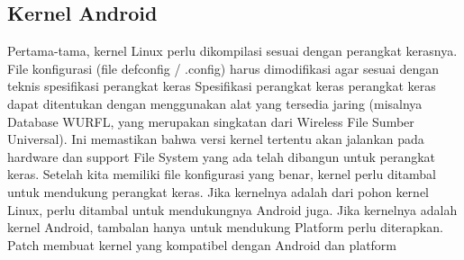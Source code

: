 		\subsection{Kernel Android}
		 Pertama-tama, kernel Linux perlu dikompilasi
		 sesuai dengan perangkat kerasnya. File konfigurasi
		 (file defconfig / .config) harus dimodifikasi agar sesuai dengan teknis
		 spesifikasi perangkat keras Spesifikasi perangkat keras
		 perangkat keras dapat ditentukan dengan menggunakan alat yang tersedia
		 jaring (misalnya Database WURFL, yang merupakan singkatan dari Wireless
		 File Sumber Universal).
		 Ini memastikan bahwa versi kernel tertentu akan
		 jalankan pada hardware dan support File System yang ada
		 telah dibangun untuk perangkat keras.
		 Setelah kita memiliki file konfigurasi yang benar, kernel perlu 
		 ditambal untuk mendukung perangkat keras. Jika kernelnya adalah
		 dari pohon kernel Linux, perlu ditambal untuk mendukungnya
		 Android juga. Jika kernelnya adalah kernel Android, tambalan hanya untuk
		 mendukung Platform perlu diterapkan.
		 Patch membuat kernel yang kompatibel dengan Android dan platform
		 
\cite{engler1995exokernel}
\cite{liedtke1996toward}
\cite{che2006hybrid}
\cite{kashiwagi1996design}
\cite{schmidt2010teaching}
\cite{wang2009usage}
\cite{lee2003firm}